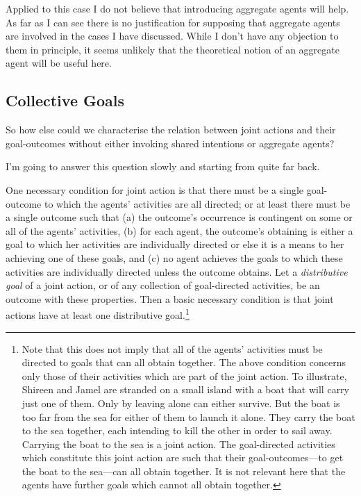 \documentclass[12pt,a4paper]{extarticle}
\begin{document}
Applied to this case I do not believe that introducing aggregate agents will help.  As far as I can see there is no justification for supposing that aggregate agents are involved in the cases I have discussed.  While I don't have any objection to them in principle, it seems unlikely that the theoretical notion of an aggregate agent will be useful here.


\subsection{Collective Goals}
So how else could we characterise the relation between joint actions and their goal-outcomes without either invoking shared intentions or aggregate agents?  

I'm going to  answer this question slowly and starting from quite far back.

One necessary condition for joint action is that there must be a single goal-outcome to which the agents' activities are all directed; or at least there must be a single outcome such that
(a) the outcome's occurrence is contingent on some or all of the agents' activities,
(b) for each agent, the outcome's obtaining is either a goal to which her activities are individually directed or else it is a means to her achieving one of these goals,
and
(c) no agent achieves the goals to which these activities are individually directed unless the outcome obtains.
Let a \emph{distributive goal} of a joint action, or of any collection of goal-directed activities, be an outcome with these properties.  Then a basic necessary condition is that joint actions have at least one distributive goal.\footnote{
Note that this does not imply that all of the agents' activities must be directed to goals that can all obtain together.
The above condition concerns only those of their  activities which are part of  the joint action.  To illustrate,  Shireen and Jamel are stranded on a small island with a boat that will carry just one of them.  Only by leaving alone can either survive.  But the boat is too far from the sea for either of them to launch it alone.  They carry the boat to the sea together, each intending to kill the other in order to sail away.  Carrying the boat to the sea is a joint action.  The goal-directed activities which constitute this joint action are such that their goal-outcomes---to get the boat to the sea---can all obtain together.  It is not relevant here that the agents have further goals which cannot all obtain together.  
}

\end{document}
